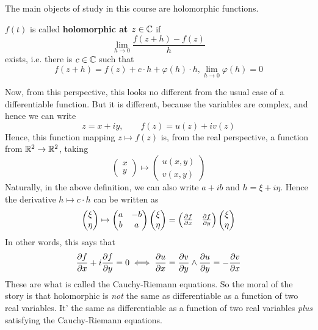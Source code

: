 \documentclass{article}
\begin{document}
The main objects of study in this course are holomorphic functions.
\begin{definition}
\(f(t)\) is called \textbf{holomorphic at \(z \in \mathbb{C}\)} if
\begin{equation}\lim_{h \to 0}\frac{f(z + h) - f(z)}{h}\end{equation}
exists, i.e. there is \(c \in \mathbb{C}\) such that
\begin{equation}f(z + h) = f(z) + c \cdot h + \varphi(h) \cdot h, \lim_{h \to 0}\varphi(h) = 0\end{equation}
\end{definition}
Now, from this perspective, this looks no different from the usual case of a differentiable function. But it is different, because the variables are complex, and hence we can write
\begin{equation}z = x + iy, \qquad f(z) = u(z) + iv(z)\end{equation}
Hence, this function mapping \(z \mapsto f(z)\) is, from the real perspective, a function from
\(\mathbb{R}^2 \to \mathbb{R}^2\), taking
\begin{equation}\begin{pmatrix} x \\ y \end{pmatrix} \mapsto \begin{pmatrix} u(x, y) \\ v(x, y) \end{pmatrix}\end{equation}
Naturally, in the above definition, we can also write \(a + ib\) and \(h = \xi + i\eta\). Hence the derivative \(h \mapsto c \cdot h\) can be written as
\begin{equation}\begin{pmatrix} \xi \\ \eta \end{pmatrix} \mapsto
\begin{pmatrix} a & -b \\ b & a \end{pmatrix}
  \begin{pmatrix} \xi \\ \eta \end{pmatrix}
= \begin{pmatrix}{\frac{\partial {f}}{\partial {x}}} & {\frac{\partial {f}}{\partial {y}}}\end{pmatrix}
  \begin{pmatrix} \xi \\ \eta \end{pmatrix}\end{equation}
In other words, this says that
\begin{equation}{\frac{\partial {f}}{\partial {x}}} + i{\frac{\partial {f}}{\partial {y}}} = 0
\iff {\frac{\partial {u}}{\partial {x}}} = {\frac{\partial {v}}{\partial {y}}} \land {\frac{\partial {u}}{\partial {y}}} = -{\frac{\partial {v}}{\partial {x}}}\end{equation}
These are what is called the Cauchy-Riemann equations. So the moral of the story is that holomorphic is \textit{not} the same as differentiable as a function of two real variables. It' the same as differentiable as a function of two real variables \textit{plus} satisfying the Cauchy-Riemann equations.
\end{document}
